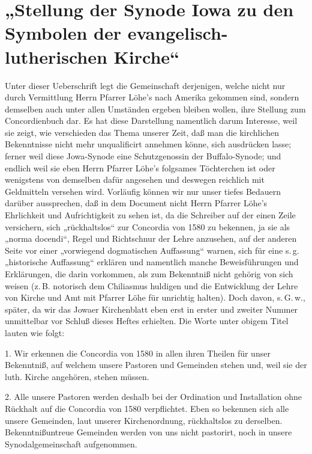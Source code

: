 \chapter[Stellung der Synode Iowa zu den Symbolen]{„Stellung der Synode Iowa zu den Symbolen der evangelisch-lutherischen Kirche“}

Unter dieser Ueberschrift legt die Gemeinschaft derjenigen, welche nicht nur durch Vermittlung Herrn Pfarrer Löhe’s nach Amerika gekommen sind,
sondern demselben auch unter allen Umständen ergeben bleiben wollen, ihre Stellung zum Concordienbuch dar. Es hat diese Darstellung namentlich darum Interesse, weil sie zeigt, wie verschieden das Thema unserer Zeit, daß man die kirchlichen Bekenntnisse nicht mehr unqualificirt annehmen könne, sich ausdrücken lasse; ferner weil diese Jowa-Synode eine Schutzgenossin der Buffalo-Synode; und endlich weil sie eben Herrn Pfarrer Löhe’s folgsames Töchterchen ist oder wenigstens von demselben dafür angesehen und deswegen reichlich mit Geldmitteln versehen wird. Vorläufig können wir nur unser tiefes Bedauern darüber aussprechen, daß in dem Document nicht Herrn Pfarrer Löhe’s Ehrlichkeit und Aufrichtigkeit zu sehen ist, da die Schreiber auf der einen Zeile versichern, sich „rückhaltslos“ zur Concordia von 1580 zu bekennen, ja sie als „norma docendi“, Regel und Richtschnur der Lehre anzusehen, auf der anderen Seite vor einer „vorwiegend dogmatischen Auffassung“ warnen, sich für eine s.\,g. „historische Auffassung“ erklären und namentlich manche Beweisführungen und Erklärungen, die darin vorkommen, als zum Bekenntniß nicht gehörig von sich weisen (z.\,B. notorisch dem Chiliasmus huldigen und die Entwicklung der Lehre von Kirche und Amt mit Pfarrer Löhe für unrichtig halten). Doch davon, s.\,G.\,w., später, da wir das Jowaer Kirchenblatt eben erst in erster und zweiter Nummer unmittelbar vor Schluß dieses Heftes erhielten. Die Worte unter obigem Titel lauten wie folgt:

1. Wir erkennen die Concordia von 1580 in allen ihren Theilen für unser Bekenntniß, auf welchem unsere Pastoren und Gemeinden stehen und, weil sie der luth. Kirche angehören, stehen müssen.

2. Alle unsere Pastoren werden deshalb bei der Ordination und Installation ohne Rückhalt auf die Concordia von 1580 verpflichtet. Eben so bekennen sich alle unsere Gemeinden, laut unserer Kirchenordnung, rückhaltslos zu derselben. Bekenntnißuntreue Gemeinden werden von uns nicht pastorirt, noch in unsere Synodalgemeinschaft aufgenommen.

